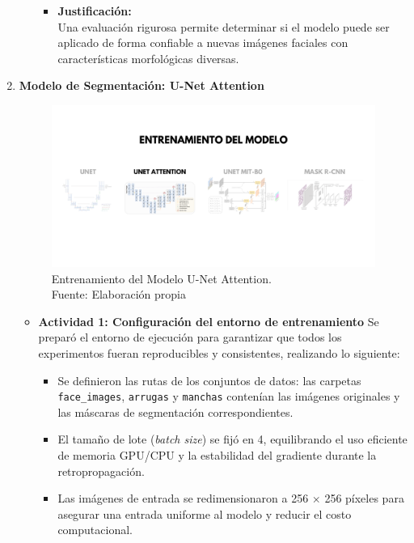 \begin{enumerate}
\begin{itemize}
\begin{itemize}
  \item \textbf{Justificación:} \\
  Una evaluación rigurosa permite determinar si el modelo puede ser aplicado de forma confiable a nuevas imágenes faciales con características morfológicas diversas.
\end{itemize}



  \end{itemize}
\newpage
  \item \textbf{Modelo de Segmentación: U-Net Attention}
  \begin{figure}[H]
	\begin{center}
		\includegraphics[width=1\textwidth]{4/figures/entrunetat.png}
		\caption[Entrenamiento del Modelo U-Net Attention]{Entrenamiento del Modelo U-Net Attention.\\
		Fuente: Elaboración propia}
		\label{4:figentunetat}
	\end{center}
\end{figure}
  \begin{itemize}
  \item\textbf{Actividad 1: Configuración del entorno de entrenamiento}
  Se preparó el entorno de ejecución para garantizar que todos los experimentos fueran reproducibles y consistentes, realizando lo siguiente:
\begin{itemize}
\item Se definieron las rutas de los conjuntos de datos: las carpetas \texttt{face\_images}, \texttt{arrugas} y \texttt{manchas} contenían las imágenes originales y las máscaras de segmentación correspondientes.
\item El tamaño de lote (\emph{batch size}) se fijó en 4, equilibrando el uso eficiente de memoria GPU/CPU y la estabilidad del gradiente durante la retropropagación.
\item Las imágenes de entrada se redimensionaron a 256 $\times$ 256 píxeles para asegurar una entrada uniforme al modelo y reducir el costo computacional.

\end{itemize}
\end{itemize}
\end{enumerate}

